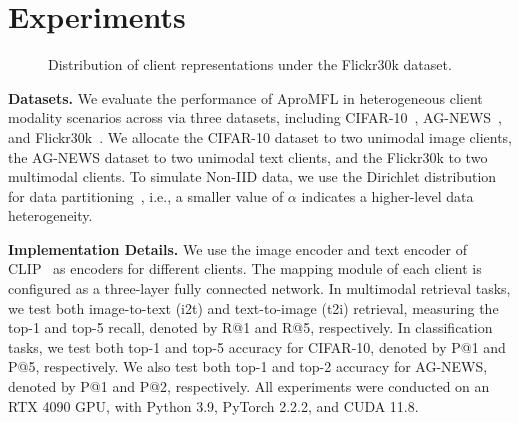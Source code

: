 \section{Experiments}
\label{sec:rationale}


\begin{figure*}[t]
  \centering

  \hfil
  \hfil
  \hfil

  \caption{Distribution of client representations under the Flickr30k dataset.}
  \label{fig-mmalign}
\end{figure*}






\noindent\textbf{Datasets.}
We evaluate the performance of AproMFL in heterogeneous client modality scenarios across via three datasets, including CIFAR-10~\cite{krizhevsky2009learning}, AG-NEWS~\cite{zhang2015character}, and Flickr30k~\cite{young2014image}. 
We allocate the CIFAR-10 dataset to two unimodal image clients, the AG-NEWS dataset to two unimodal text clients, and the Flickr30k to two multimodal clients. 
To simulate Non-IID data, we use the Dirichlet distribution for data partitioning~\cite{hsu2019measuring}, i.e., a smaller value of $\alpha$ indicates a higher-level data heterogeneity. 


\noindent\textbf{Implementation Details.}
We use the image encoder and text encoder of CLIP~\cite{radford2021learning} as encoders for different clients. 
The mapping module of each client is configured as a three-layer fully connected network.
In multimodal retrieval tasks, we test both image-to-text (i2t) and text-to-image (t2i) retrieval, measuring the top-1 and top-5 recall, denoted by R@1 and R@5, respectively.
In classification tasks, we test both top-1 and top-5 accuracy for CIFAR-10, denoted by P@1 and P@5, respectively. We also test both top-1 and top-2 accuracy for AG-NEWS, denoted by P@1 and P@2, respectively.
All experiments were conducted on an RTX 4090 GPU, with Python 3.9, PyTorch 2.2.2, and CUDA 11.8.

